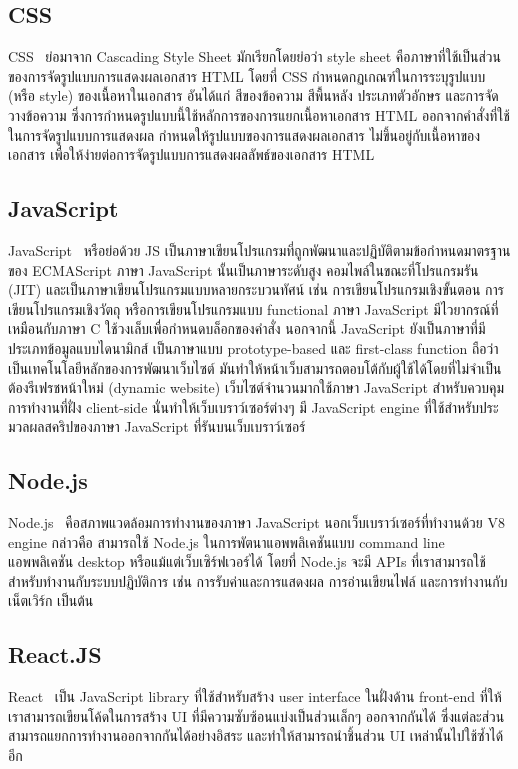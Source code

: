 \subsection{CSS}
CSS~ \cite{CSS} ย่อมาจาก Cascading Style Sheet  มักเรียกโดยย่อว่า style sheet คือภาษาที่ใช้เป็นส่วนของการจัดรูปแบบการแสดงผลเอกสาร  HTML โดยที่ CSS กำหนดกฏเกณฑ์ในการระบุรูปแบบ (หรือ style) ของเนื้อหาในเอกสาร 
อันได้แก่ สีของข้อความ สีพื้นหลัง ประเภทตัวอักษร และการจัดวางข้อความ ซึ่งการกำหนดรูปแบบนี้ใช้หลักการของการแยกเนื้อหาเอกสาร HTML ออกจากคำสั่งที่ใช้ในการจัดรูปแบบการแสดงผล กำหนดให้รูปแบบของการแสดงผลเอกสาร 
ไม่ขึ้นอยู่กับเนื้อหาของเอกสาร เพื่อให้ง่ายต่อการจัดรูปแบบการแสดงผลลัพธ์ของเอกสาร HTML

\subsection{JavaScript}
JavaScript~ \cite{JavaScript} หรือย่อด้วย JS เป็นภาษาเขียนโปรแกรมที่ถูกพัฒนาและปฏิบัติตามข้อกำหนดมาตรฐานของ ECMAScript
ภาษา JavaScript นั้นเป็นภาษาระดับสูง คอมไพล์ในขณะที่โปรแกรมรัน (JIT) และเป็นภาษาเขียนโปรแกรมแบบหลายกระบวนทัศน์ เช่น การเขียนโปรแกรมเชิงขั้นตอน การเขียนโปรแกรมเชิงวัตถุ หรือการเขียนโปรแกรมแบบ functional 
ภาษา JavaScript มีไวยากรณ์ที่เหมือนกับภาษา C ใช้วงเล็บเพื่อกำหนดบล็อกของคำสั่ง นอกจากนี้ JavaScript ยังเป็นภาษาที่มีประเภทข้อมูลแบบไดนามิกส์ เป็นภาษาแบบ prototype-based และ first-class function
%
ถือว่าเป็นเทคโนโลยีหลักของการพัฒนาเว็บไซต์ มันทำให้หน้าเว็บสามารถตอบโต้กับผู้ใช้ได้โดยที่ไม่จำเป็นต้องรีเฟรชหน้าใหม่ (dynamic website) เว็บไซต์จำนวนมากใช้ภาษา JavaScript 
สำหรับควบคุมการทำงานที่ฝั่ง client-side นั่นทำให้เว็บเบราว์เซอร์ต่างๆ มี JavaScript engine ที่ใช้สำหรับประมวลผลสคริปของภาษา JavaScript ที่รันบนเว็บเบราว์เซอร์

\subsection{Node.js}
Node.js~ \cite{NodeJS} คือสภาพแวดล้อมการทำงานของภาษา JavaScript นอกเว็บเบราว์เซอร์ที่ทำงานด้วย V8 engine กล่าวคือ สามารถใช้ Node.js ในการพัตนาแอพพลิเคชันแบบ command line แอพพลิเคชัน desktop หรือแม้แต่เว็บเซิร์ฟเวอร์ได้ 
โดยที่ Node.js จะมี APIs ที่เราสามารถใช้สำหรับทำงานกับระบบปฏิบัติการ เช่น การรับค่าและการแสดงผล การอ่านเขียนไฟล์ และการทำงานกับเน็ตเวิร์ก เป็นต้น

\subsection{React.JS}
React~ \cite{ReactJS} เป็น JavaScript library ที่ใช้สำหรับสร้าง user interface ในฝั่งด้าน front-end ที่ให้เราสามารถเขียนโค้ดในการสร้าง UI ที่มีความซับซ้อนแบ่งเป็นส่วนเล็กๆ ออกจากกันได้ ซึ่งแต่ละส่วนสามารถแยกการทำงานออกจากกันได้อย่างอิสระ 
และทำให้สามารถนำชิ้นส่วน UI เหล่านั้นไปใช้ซ้ำได้อีก

